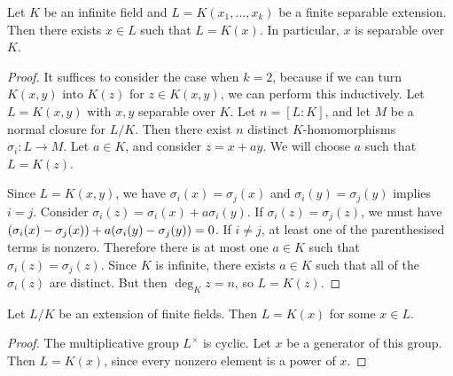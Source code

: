 \begin{theorem}
	Let \( K \) be an infinite field and \( L = K(x_1, \dots, x_k) \) be a finite separable extension.
	Then there exists \( x \in L \) such that \( L = K(x) \).
	In particular, \( x \) is separable over \( K \).
\end{theorem}
\begin{proof}
	It suffices to consider the case when \( k = 2 \), because if we can turn \( K(x,y) \) into \( K(z) \) for \( z \in K(x,y) \), we can perform this inductively.
	Let \( L = K(x,y) \) with \( x, y \) separable over \( K \).
	Let \( n = [L : K] \), and let \( M \) be a normal closure for \( L / K \).
	Then there exist \( n \) distinct \( K \)-homomorphisms \( \sigma_i \colon L \to M \).
	Let \( a \in K \), and consider \( z = x + ay \).
	We will choose \( a \) such that \( L = K(z) \).

	Since \( L = K(x,y) \), we have \( \sigma_i(x) = \sigma_j(x) \) and \( \sigma_i(y) = \sigma_j(y) \) implies \( i = j \).
	Consider \( \sigma_i(z) = \sigma_i(x) + a \sigma_i(y) \).
	If \( \sigma_i(z) = \sigma_j(z) \), we must have \( \qty(\sigma_i(x) - \sigma_j(x)) + a \qty(\sigma_i(y) - \sigma_j(y)) = 0 \).
	If \( i \neq j \), at least one of the parenthesised terms is nonzero.
	Therefore there is at most one \( a \in K \) such that \( \sigma_i(z) = \sigma_j(z) \).
	Since \( K \) is infinite, there exists \( a \in K \) such that all of the \( \sigma_i(z) \) are distinct.
	But then \( \deg_K z = n \), so \( L = K(z) \).
\end{proof}
\begin{theorem}
	Let \( L / K \) be an extension of finite fields.
	Then \( L = K(x) \) for some \( x \in L \).
\end{theorem}
\begin{proof}
	The multiplicative group \( L^\times \) is cyclic.
	Let \( x \) be a generator of this group.
	Then \( L = K(x) \), since every nonzero element is a power of \( x \).
\end{proof}
